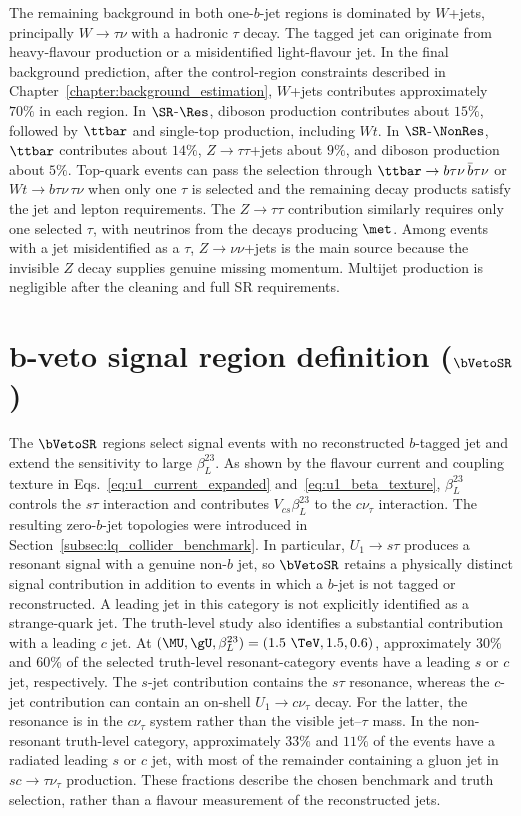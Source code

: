 The remaining background in both one-$b$-jet regions is dominated by $W$+jets, principally $W\to\tau\nu$ with a hadronic $\tau$ decay.
The tagged jet can originate from heavy-flavour production or a misidentified light-flavour jet.
In the final background prediction, after the control-region constraints described in Chapter~\ref{chapter:background_estimation}, $W$+jets contributes approximately $70\%$ in each region.
In $\SR$-$\Res$, diboson production contributes about $15\%$, followed by $\ttbar$ and single-top production, including $Wt$.
In $\SR$-$\NonRes$, $\ttbar$ contributes about $14\%$, $Z\to\tau\tau$+jets about $9\%$, and diboson production about $5\%$.
Top-quark events can pass the selection through $\ttbar\to b\tau\nu\,\bar b\tau\nu$ or $Wt\to b\tau\nu\,\tau\nu$ when only one $\tau$ is selected and the remaining decay products satisfy the jet and lepton requirements.
The $Z\to\tau\tau$ contribution similarly requires only one selected $\tau$, with neutrinos from the decays producing $\met$.
Among events with a jet misidentified as a $\tau$, $Z\to\nu\nu$+jets is the main source because the invisible $Z$ decay supplies genuine missing momentum.
Multijet production is negligible after the cleaning and full SR requirements.

\clearpage
\section[b-veto signal region definition (SR0b)]{b-veto signal region definition ($\bVetoSR$)}
\label{sec:ch7_sr0b}

The $\bVetoSR$ regions select signal events with no reconstructed $b$-tagged jet and extend the sensitivity to large $\beta_L^{23}$.
As shown by the flavour current and coupling texture in Eqs.~\ref{eq:u1_current_expanded} and~\ref{eq:u1_beta_texture}, $\beta_L^{23}$ controls the $s\tau$ interaction and contributes $V_{cs}\beta_L^{23}$ to the $c\nu_\tau$ interaction.
The resulting zero-$b$-jet topologies were introduced in Section~\ref{subsec:lq_collider_benchmark}.
In particular, $U_1\to s\tau$ produces a resonant signal with a genuine non-$b$ jet, so $\bVetoSR$ retains a physically distinct signal contribution in addition to events in which a $b$-jet is not tagged or reconstructed.
A leading jet in this category is not explicitly identified as a strange-quark jet.
The truth-level study also identifies a substantial contribution with a leading $c$ jet.
At $(\MU,\gU,\beta_L^{23})=(1.5~\TeV,1.5,0.6)$, approximately $30\%$ and $60\%$ of the selected truth-level resonant-category events have a leading $s$ or $c$ jet, respectively.
The $s$-jet contribution contains the $s\tau$ resonance, whereas the $c$-jet contribution can contain an on-shell $U_1\to c\nu_\tau$ decay.
For the latter, the resonance is in the $c\nu_\tau$ system rather than the visible jet--$\tau$ mass.
In the non-resonant truth-level category, approximately $33\%$ and $11\%$ of the events have a radiated leading $s$ or $c$ jet, with most of the remainder containing a gluon jet in $sc\to\tau\nu_\tau$ production.
These fractions describe the chosen benchmark and truth selection, rather than a flavour measurement of the reconstructed jets.

